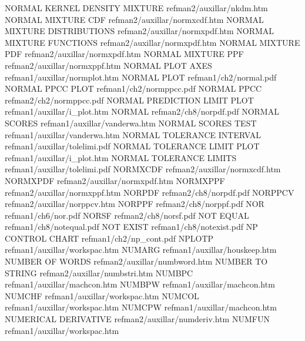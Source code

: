 NORMAL KERNEL DENSITY MIXTURE           refman2/auxillar/nkdm.htm
NORMAL MIXTURE CDF                      refman2/auxillar/normxcdf.htm
NORMAL MIXTURE DISTRIBUTIONS            refman2/auxillar/normxpdf.htm
NORMAL MIXTURE FUNCTIONS                refman2/auxillar/normxpdf.htm
NORMAL MIXTURE PDF                      refman2/auxillar/normxpdf.htm
NORMAL MIXTURE PPF                      refman2/auxillar/normxppf.htm
NORMAL PLOT AXES                        refman1/auxillar/normplot.htm
NORMAL PLOT                             refman1/ch2/normal.pdf
NORMAL PPCC PLOT                        refman1/ch2/normppcc.pdf
NORMAL PPCC                             refman2/ch2/normppcc.pdf
NORMAL PREDICTION LIMIT PLOT            refman1/auxillar/i_plot.htm
NORMAL                                  refman2/ch8/norpdf.pdf
NORMAL SCORES                           refman1/auxillar/vanderwa.htm
NORMAL SCORES TEST                      refman1/auxillar/vanderwa.htm
NORMAL TOLERANCE INTERVAL               refman1/auxillar/tolelimi.pdf
NORMAL TOLERANCE LIMIT PLOT             refman1/auxillar/i_plot.htm
NORMAL TOLERANCE LIMITS                 refman1/auxillar/tolelimi.pdf
NORMXCDF                                refman2/auxillar/normxcdf.htm
NORMXPDF                                refman2/auxillar/normxpdf.htm
NORMXPPF                                refman2/auxillar/normxppf.htm
NORPDF                                  refman2/ch8/norpdf.pdf
NORPPCV                                 refman2/auxillar/norppcv.htm
NORPPF                                  refman2/ch8/norppf.pdf
NOR                                     refman1/ch6/nor.pdf
NORSF                                   refman2/ch8/norsf.pdf
NOT EQUAL                               refman1/ch8/notequal.pdf
NOT EXIST                               refman1/ch8/notexist.pdf
NP CONTROL CHART                        refman1/ch2/np_cont.pdf
NPLOTP                                  refman1/auxillar/workspac.htm
NUMARG                                  refman1/auxillar/houskeep.htm
NUMBER OF WORDS                         refman2/auxillar/numbword.htm
NUMBER TO STRING                        refman2/auxillar/numbstri.htm
NUMBPC                                  refman1/auxillar/machcon.htm
NUMBPW                                  refman1/auxillar/machcon.htm
NUMCHF                                  refman1/auxillar/workspac.htm
NUMCOL                                  refman1/auxillar/workspac.htm
NUMCPW                                  refman1/auxillar/machcon.htm
NUMERICAL DERIVATIVE                    refman2/auxillar/numderiv.htm
NUMFUN                                  refman1/auxillar/workspac.htm
